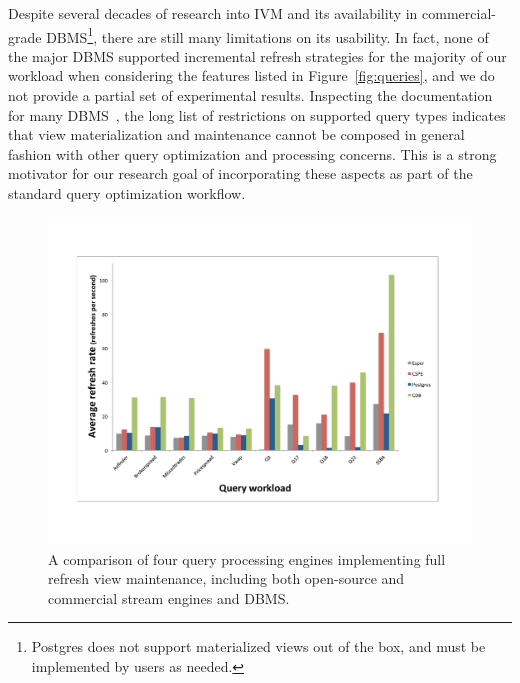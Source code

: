 \vspace{1mm}
Despite several decades of research into IVM and its availability in
commercial-grade DBMS\footnote{Postgres does not support materialized views out
of the box, and must be implemented by users as needed.}, there are still many
limitations on its usability. In fact, none of the major DBMS supported
incremental refresh strategies for the majority of our workload when considering
the features listed in Figure~\ref{fig:queries}, and we do not provide a partial
set of experimental results. Inspecting the documentation for many
DBMS~, the long list of restrictions on supported query
types indicates that view materialization and maintenance cannot be composed in
general fashion with other query optimization and processing concerns. This is a
strong motivator for our research goal of incorporating these aspects as part of
the standard query optimization workflow.

\begin{figure}[htbp]
\begin{center}
\includegraphics[scale=0.33]{../graphs/graphs/engine-comparison.pdf}
\end{center}
\vspace{-4mm}
\caption{A comparison of four query processing engines implementing full refresh
view maintenance, including both open-source and commercial stream engines and
DBMS.}
\label{fig:enginecomp}
\end{figure}

